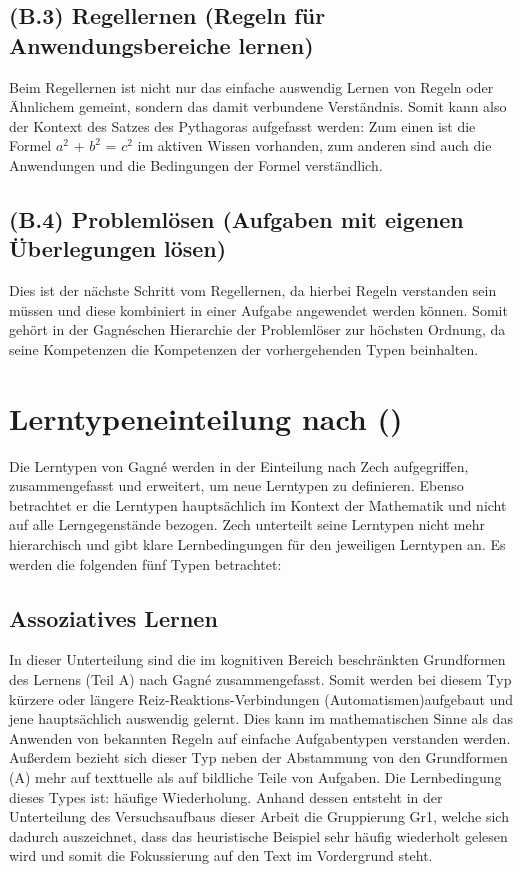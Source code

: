 \subsection[]{(B.3) Regellernen (Regeln für Anwendungsbereiche lernen)}

Beim Regellernen ist nicht nur das einfache auswendig Lernen von Regeln oder Ähnlichem gemeint, sondern das damit verbundene Verständnis. Somit kann also der Kontext des Satzes des Pythagoras aufgefasst werden: Zum einen ist die Formel $a^2$ + $b^2$ = $c^2$ im aktiven Wissen vorhanden, zum anderen sind auch die Anwendungen und die Bedingungen der Formel verständlich.

\subsection[]{(B.4) Problemlösen (Aufgaben mit eigenen Überlegungen lösen)}

Dies ist der nächste Schritt vom Regellernen, da hierbei Regeln verstanden sein müssen und diese kombiniert in einer Aufgabe angewendet werden können. Somit gehört in der Gagnéschen Hierarchie der Problemlöser zur höchsten Ordnung, da seine Kompetenzen die Kompetenzen der vorhergehenden Typen beinhalten.

\section{Lerntypeneinteilung nach \citeauthor{zech1983grundkurs} ()}

Die Lerntypen von Gagné werden in der Einteilung nach Zech aufgegriffen, zusammengefasst und erweitert, um neue Lerntypen zu definieren. Ebenso betrachtet er die Lerntypen hauptsächlich im Kontext der Mathematik und nicht auf alle Lerngegenstände bezogen. Zech unterteilt seine Lerntypen nicht mehr hierarchisch und gibt klare Lernbedingungen für den jeweiligen Lerntypen an. Es werden die folgenden fünf Typen betrachtet:

\subsection[]{Assoziatives Lernen}

In dieser Unterteilung sind die im kognitiven Bereich beschränkten Grundformen des Lernens (Teil A) nach Gagné zusammengefasst. Somit werden bei diesem Typ \grqq kürzere oder längere Reiz-Reaktions-Verbindungen (Automatismen)\grqq  aufgebaut und jene hauptsächlich auswendig gelernt. Dies kann im mathematischen Sinne als das Anwenden von bekannten Regeln auf einfache Aufgabentypen verstanden werden. Außerdem bezieht sich dieser Typ neben der Abstammung von den Grundformen (A) mehr auf texttuelle als auf bildliche Teile von Aufgaben.
Die Lernbedingung dieses Types ist: häufige Wiederholung. 
Anhand dessen entsteht in der Unterteilung des Versuchsaufbaus dieser Arbeit die Gruppierung \gls{Gr1}, welche sich dadurch auszeichnet, dass das heuristische Beispiel sehr häufig wiederholt gelesen wird und somit die Fokussierung auf den Text im Vordergrund steht. 


